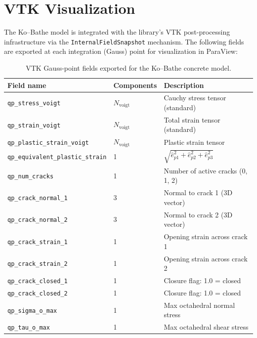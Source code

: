 \section{VTK Visualization}
\label{sec:kb-vtk}

The Ko--Bathe model is integrated with the library's VTK post-processing
infrastructure via the \texttt{InternalFieldSnapshot} mechanism.  The
following fields are exported at each integration (Gauss) point for
visualization in ParaView:

\begin{table}[htb]
\centering
\caption{VTK Gauss-point fields exported for the Ko--Bathe concrete model.}
\label{tab:kb-vtk-fields}
\begin{tabular}{@{}llp{7cm}@{}}
\toprule
\textbf{Field name} & \textbf{Components} & \textbf{Description} \\
\midrule
\texttt{qp\_stress\_voigt}      & $N_{\text{voigt}}$ & Cauchy stress tensor (standard) \\
\texttt{qp\_strain\_voigt}      & $N_{\text{voigt}}$ & Total strain tensor (standard) \\
\texttt{qp\_plastic\_strain\_voigt} & $N_{\text{voigt}}$ & Plastic strain tensor \\
\texttt{qp\_equivalent\_plastic\_strain} & 1 & $\sqrt{\hat{e}_{p1}^2+\hat{e}_{p2}^2+\hat{e}_{p3}^2}$ \\[\jot]
\texttt{qp\_num\_cracks}        & 1 & Number of active cracks (0, 1, 2) \\
\texttt{qp\_crack\_normal\_1}   & 3 & Normal to crack 1 (3D vector) \\
\texttt{qp\_crack\_normal\_2}   & 3 & Normal to crack 2 (3D vector) \\
\texttt{qp\_crack\_strain\_1}   & 1 & Opening strain across crack 1 \\
\texttt{qp\_crack\_strain\_2}   & 1 & Opening strain across crack 2 \\
\texttt{qp\_crack\_closed\_1}   & 1 & Closure flag: 1.0 = closed \\
\texttt{qp\_crack\_closed\_2}   & 1 & Closure flag: 1.0 = closed \\[\jot]
\texttt{qp\_sigma\_o\_max}      & 1 & Max octahedral normal stress \\
\texttt{qp\_tau\_o\_max}        & 1 & Max octahedral shear stress \\
\bottomrule
\end{tabular}
\end{table}

